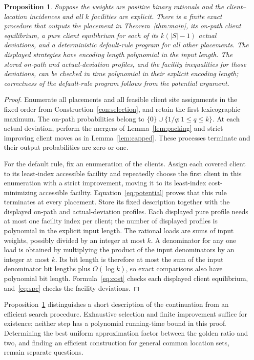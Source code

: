 \documentclass[11pt]{amsart}
\newtheorem{proposition}[theorem]{Proposition}
\theoremstyle{definition}
\newcommand{\set}[1]{\{#1\}}
\begin{document}
\begin{proposition}\label{prop:certificate}
Suppose the weights are positive binary rationals and the client--location incidences and all $k$ facilities are explicit. There is a finite exact procedure that outputs the placement in Theorem~\ref{thm:main}, its on-path client equilibrium, a pure client equilibrium for each of its $k(|S|-1)$ actual deviations, and a deterministic default-rule program for all other placements. The displayed strategies have encoding length polynomial in the input length. The stored on-path and actual-deviation profiles, and the facility inequalities for those deviations, can be checked in time polynomial in their explicit encoding length; correctness of the default-rule program follows from the potential argument.
\end{proposition}
\begin{proof}
Enumerate all placements and all feasible client site assignments in the fixed order from Construction~\ref{con:selection}, and retain the first lexicographic maximum. The on-path probabilities belong to $\set{0}\cup\set{1/q:1\le q\le k}$. At each actual deviation, perform the mergers of Lemma~\ref{lem:packing} and strict improving client moves as in Lemma~\ref{lem:capped}. These processes terminate and their output probabilities are zero or one.

For the default rule, fix an enumeration of the clients. Assign each covered client to its least-index accessible facility and repeatedly choose the first client in this enumeration with a strict improvement, moving it to its least-index cost-minimizing accessible facility. Equation~\eqref{eq:potential} proves that this rule terminates at every placement. Store its fixed description together with the displayed on-path and actual-deviation profiles. Each displayed pure profile needs at most one facility index per client; the number of displayed profiles is polynomial in the explicit input length. The rational loads are sums of input weights, possibly divided by an integer at most $k$. A denominator for any one load is obtained by multiplying the product of the input denominators by an integer at most $k$. Its bit length is therefore at most the sum of the input denominator bit lengths plus $O(\log k)$, so exact comparisons also have polynomial bit length. Formula~\eqref{eq:cost} checks each displayed client equilibrium, and~\eqref{eq:spe} checks the facility deviations.
\end{proof}

Proposition~\ref{prop:certificate} distinguishes a short description of the continuation from an efficient search procedure. Exhaustive selection and finite improvement suffice for existence; neither step has a polynomial running-time bound in this proof. Determining the best uniform approximation factor between the golden ratio and two, and finding an efficient construction for general common location sets, remain separate questions.

\enlargethispage{3\baselineskip}


\end{document}
